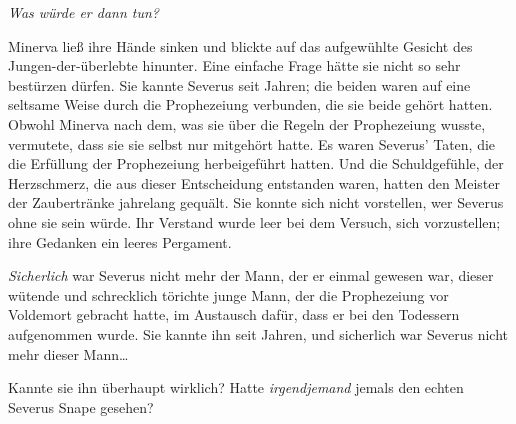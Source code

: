 \later

\emph{Was würde er dann tun?}

Minerva ließ ihre Hände sinken und blickte auf das aufgewühlte Gesicht des Jungen-der-überlebte hinunter. Eine einfache Frage hätte sie nicht so sehr bestürzen dürfen. Sie kannte Severus seit Jahren; die beiden waren auf eine seltsame Weise durch die Prophezeiung verbunden, die sie beide gehört hatten. Obwohl Minerva nach dem, was sie über die Regeln der Prophezeiung wusste, vermutete, dass sie sie selbst nur mitgehört hatte. Es waren Severus' Taten, die die Erfüllung der Prophezeiung herbeigeführt hatten. Und die Schuldgefühle, der Herzschmerz, die aus dieser Entscheidung entstanden waren, hatten den Meister der Zaubertränke jahrelang gequält. Sie konnte sich nicht vorstellen, wer Severus ohne sie sein würde. Ihr Verstand wurde leer bei dem Versuch, sich vorzustellen; ihre Gedanken ein leeres Pergament.

\emph{Sicherlich} war Severus nicht mehr der Mann, der er einmal gewesen war, dieser wütende und schrecklich törichte junge Mann, der die Prophezeiung vor Voldemort gebracht hatte, im Austausch dafür, dass er bei den Todessern aufgenommen wurde.
Sie kannte ihn seit Jahren, und sicherlich war Severus nicht mehr dieser Mann…


Kannte sie ihn überhaupt wirklich? Hatte \emph{irgendjemand} jemals den echten Severus Snape gesehen?

